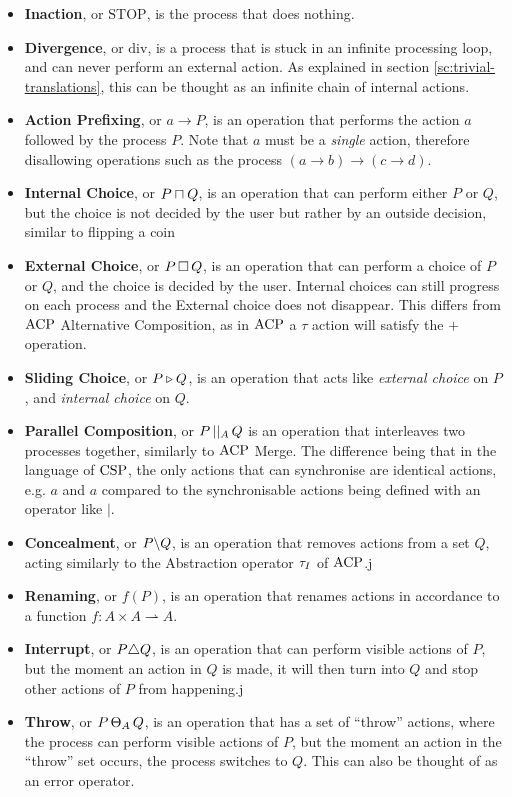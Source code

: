 \documentclass[../hons_project.tex]{subfiles}
\begin{document}

\begin{itemize}
    \item \textbf{Inaction}, or $\mathrm{STOP}$, is the process that does nothing.
    \item \textbf{Divergence}, or $\mathrm{div}$, is a process that is stuck in an infinite processing loop, and can never perform an external action. As explained in section \ref{sc:trivial-translations}, this can be thought as an infinite chain of internal actions.
    \item \textbf{Action Prefixing}, or $a \to P$, is an operation that performs the action $a$ followed by the process $P$. Note that $a$ must be a \textit{single} action, therefore disallowing operations such as the process $(a \to b) \to (c \to d)$.
    \item \textbf{Internal Choice}, or $P \sqcap Q$, is an operation that can perform either $P$ or $Q$, but the choice is not decided by the user but rather by an outside decision, similar to flipping a coin
    \item \textbf{External Choice}, or $P \,\square\, Q$, is an operation that can perform a choice of $P$ or $Q$, and the choice is decided by the user. Internal choices can still progress on each process and the External choice does not disappear. This differs from $\mathrm{ACP}$ Alternative Composition, as in $\mathrm{ACP}$ a $\tau$ action will satisfy the $+$ operation.
    \item \textbf{Sliding Choice}, or $P \triangleright Q$, is an operation that acts like \textit{external choice} on $P$, and \textit{internal choice} on $Q$.
    \item \textbf{Parallel Composition}, or $P \,\vert\vert_{A}\, Q$ is an operation that interleaves two processes together, similarly to $\mathrm{ACP}$ Merge. The difference being that in the language of $\mathrm{CSP}$, the only actions that can synchronise are identical actions, e.g. $a$ and $a$ compared to the synchronisable actions being defined with an operator like $\mid$.
    \item \textbf{Concealment}, or $P \backslash Q$, is an operation that removes actions from a set $Q$, acting similarly to the Abstraction operator $\tau_{I}$ of $\mathrm{ACP}$.j
    \item \textbf{Renaming}, or $f(P)$, is an operation that renames actions in accordance to a function $f : A \times A \rightharpoonup A$.
    \item \textbf{Interrupt}, or $P \triangle Q$, is an operation that can perform visible actions of $P$, but the moment an action in $Q$ is made, it will then turn into $Q$ and stop other actions of $P$ from happening.j
    \item \textbf{Throw}, or $P \,\Theta_{A}\, Q$, is an operation that has a set of ``throw'' actions, where the process can perform visible actions of $P$, but the moment an action in the ``throw'' set occurs, the process switches to $Q$. This can also be thought of as an error operator.
\end{itemize}
\end{document}
